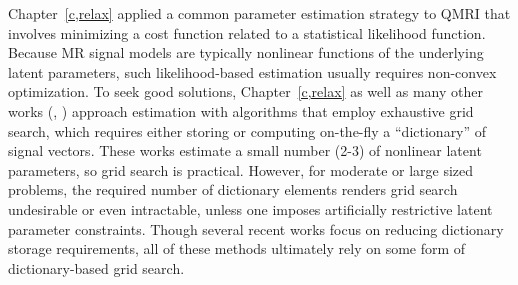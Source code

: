 Chapter~\ref{c,relax} applied
a common parameter estimation strategy to QMRI
that involves minimizing a cost function
related to a statistical likelihood function.
Because MR signal models are typically nonlinear functions
of the underlying latent parameters,
such likelihood-based estimation
usually requires non-convex optimization.
To seek good solutions,
Chapter~\ref{c,relax}
as well as many other works
(\eg, 
\cite{%
	haldar:07:mle,%
	hernando:08:jeo,%
	barral:10:arm,%
	staroswiecki:12:seo,%
	ma:13:mrf,%
	trzasko:13:etf,%
	mcgivney:14:scf,%
	zhao:14:mbm,%
	beneliezer:15:raa,%
		zhao:15:amp,%
	cauley:15:fgm,%
	zhao:16:mlr,%
	nataraj:17:oms,%
	asslander:18:lra,%
	yang:18:lra%
})
approach estimation
with algorithms
that employ exhaustive grid search,
which requires either storing
or computing on-the-fly 
a ``dictionary'' of signal vectors.
These works estimate a small number (2-3)
of nonlinear latent parameters,
so grid search is practical.
However, 
for moderate or large sized problems,
the required number 
of dictionary elements
renders grid search undesirable or even intractable,
unless one imposes artificially restrictive latent parameter constraints.
Though several recent works
\cite{%
	mcgivney:14:scf,%
	cauley:15:fgm,%
	asslander:18:lra,%
	yang:18:lra%
}
focus on reducing dictionary storage requirements,
all of these methods ultimately rely 
on some form of dictionary-based grid search.

